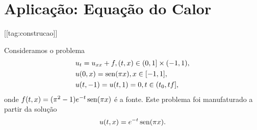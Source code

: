 \section{Aplicação: Equação do Calor}\label{cap_mlp_sec_calor}
[[tag:construcao]]

Consideramos o problema
\begin{subequations}\label{cap_mlp_sec_calor:eq:prob}
  \begin{align}
    &u_t = u_{xx} + f, (t,x)\in (0, 1] \times (-1, 1),\\
    &u(0,x) = \operatorname{sen}(\pi x), x\in [-1, 1],\\
    &u(t,-1) = u(t,1) = 0, t\in (t_0, tf],
  \end{align}
\end{subequations}
onde $f(t,x) = (\pi^2 - 1)e^{-t}\operatorname{sen}(\pi x)$ é a fonte. Este problema foi manufaturado a partir da solução
\begin{equation}
  u(t,x) = e^{-t}\operatorname{sen}(\pi x).
\end{equation}




